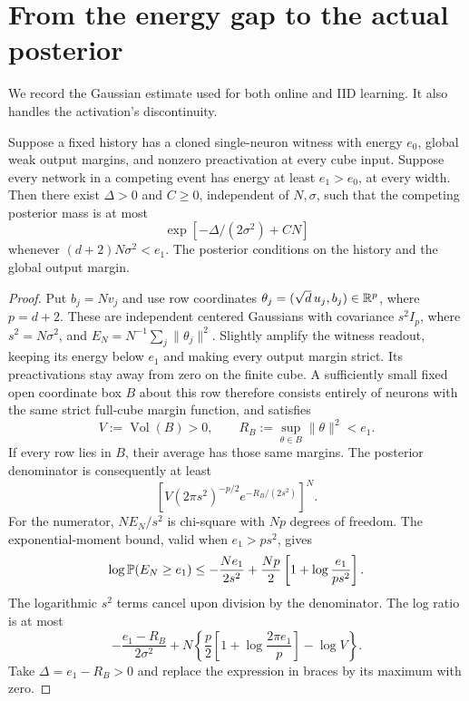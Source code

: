 \section{From the energy gap to the actual posterior}

We record the Gaussian estimate used for both online and IID learning.
It also handles the activation's discontinuity.

\begin{lemma}\label{lem:box}
Suppose a fixed history has a cloned single-neuron witness with energy
$e_0$, global weak output margins, and nonzero preactivation at every
cube input. Suppose every network in a competing event has energy at
least $e_1>e_0$, at every width. Then there exist $\Delta>0$ and
$C\ge0$, independent of $N,\sigma$, such that the competing posterior
mass is at most
\begin{equation}\label{eq:posterior-bound}
 \exp[-\Delta/(2\sigma^2)+CN]
\end{equation}
whenever $(d+2)N\sigma^2<e_1$. The posterior conditions on the history
and the global output margin.
\end{lemma}

\begin{proof}
Put $b_j=Nv_j$ and use row coordinates
$\theta_j=(\sqrt d\,u_j,b_j)\in\mathbb R^p$, where $p=d+2$.
These are independent centered Gaussians with covariance $s^2I_p$,
where $s^2=N\sigma^2$, and
$E_N=N^{-1}\sum_j\|\theta_j\|^2$.
Slightly amplify the witness readout, keeping its energy below $e_1$
and making every output margin strict. Its preactivations stay away
from zero on the finite cube. A sufficiently small fixed open coordinate
box $B$ about this row therefore consists entirely of neurons with the
same strict full-cube margin function, and satisfies
\[
 V:=\operatorname{Vol}(B)>0,\qquad
 R_B:=\sup_{\theta\in B}\|\theta\|^2<e_1.
\]
If every row lies in $B$, their average has those same margins. The
posterior denominator is consequently at least
\[
 \left[V(2\pi s^2)^{-p/2}e^{-R_B/(2s^2)}\right]^N.
\]
For the numerator, $NE_N/s^2$ is chi-square with $Np$ degrees of
freedom. The exponential-moment bound, valid when $e_1>ps^2$, gives
\[
 \log\mathbb P(E_N\ge e_1)
 \le-\frac{Ne_1}{2s^2}
     +\frac{Np}{2}\left[1+\log\frac{e_1}{ps^2}\right].
\]
The logarithmic $s^2$ terms cancel upon division by the denominator.
The log ratio is at most
\[
 -\frac{e_1-R_B}{2\sigma^2}
 +N\left\{\frac p2\left[1+\log\frac{2\pi e_1}{p}\right]-\log V\right\}.
\]
Take $\Delta=e_1-R_B>0$ and replace the expression in braces by its
maximum with zero.
\end{proof}


